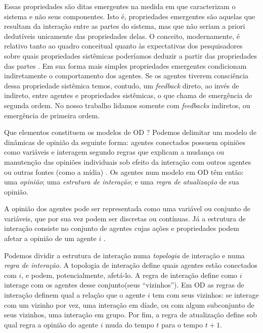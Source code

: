   Essas propriedades são ditas emergentes na medida em que caracterizam o
  sistema e não seus componentes. Isto é, propriedades emergentes são aquelas
  que resultam da interação entre as partes do sistema, mas que não seriam a
  priori dedutíveis unicamente das propriedades delas. O conceito, modernamente,
  é relativo tanto ao quadro conceitual quanto às expectativas dos pesquisadores
  sobre quais propriedades sistêmicas poderíamos deduzir a partir das
  propriedades das partes \cite{epstein2006generative}. Em sua forma mais
  simples propriedades emergentes condicionam indiretamente o comportamento dos
  agentes. Se os agentes tiverem consciência dessa propriedade sistêmica temos,
  contudo, um \textit{feedback} direto, ao invés de indireto, entre agentes e
  propriedades sistêmicas, o que  chama de
  emergência de segunda ordem. No nosso trabalho lidamos somente com
  \textit{feedbacks} indiretos, ou emergência de primeira ordem.

  
  Que elementos constituem os modelos de OD ? Podemos delimitar um modelo de
  dinâmicas de opinião da seguinte forma: agentes conectados possuem opiniões
  como variáveis e interagem segundo regras que explicam a mudança ou manutenção
  das opiniões individuais sob efeito da interação com outros agentes ou outras
  fontes (como a mídia) \cite{sirbu2017opinion}. Os agentes num modelo em OD têm
  então: uma \textit{opinião}; uma \textit{estrutura de interação}; e uma
  \textit{regra de atualização} de sua opinião.


  A opinião dos agentes pode ser representada como uma variável ou conjunto de
  variáveis, que por sua vez podem ser discretas ou contínuas. Já a estrutura de
  interação consiste no conjunto de agentes cujas ações e propriedades podem
  afetar a opinião de um agente \(i\) \cite{page2008uncertainty}.

  Podemos dividir a estrutura de interação numa \textit{topologia} de interação e
  numa \textit{regra de interação}. A topologia de interação define quais
  agentes estão conectados com \(i\), e podem, potencialmente, afetá-lo. A regra
  de interação define como \(i\) interage com os agentes desse conjunto(seus
  ``vizinhos''). Em OD as regras de interação definem qual a
  relação que o agente \(i\) tem com seus vizinhos: se interage com um vizinho
  por vez, uma interação em díade, ou com algum subconjunto de seus vizinhos,
  uma interação em grupo. Por fim, a regra de atualização define sob qual regra
  a opinião do agente \(i\) muda do tempo \(t\) para o tempo \(t+1\). 

